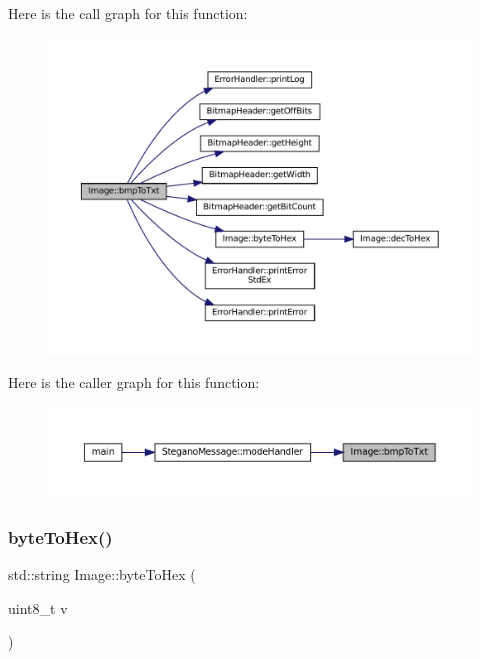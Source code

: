 Here is the call graph for this function\+:\nopagebreak
\begin{figure}[H]
\begin{center}
\leavevmode
\includegraphics[width=350pt]{classImage_aa16c9acd068079c676dec4186262b1b7_cgraph}
\end{center}
\end{figure}
Here is the caller graph for this function\+:\nopagebreak
\begin{figure}[H]
\begin{center}
\leavevmode
\includegraphics[width=350pt]{classImage_aa16c9acd068079c676dec4186262b1b7_icgraph}
\end{center}
\end{figure}
\mbox{\label{classImage_ac1c14eba8a20f8bb71c3c21eaba90ecb}} 
\subsubsection{\texorpdfstring{byteToHex()}{byteToHex()}}
{\footnotesize\ttfamily std\+::string Image\+::byte\+To\+Hex (\begin{DoxyParamCaption}\item[{uint8\+\_\+t}]{v }\end{DoxyParamCaption})\hspace{0.3cm}{\ttfamily [static]}}



